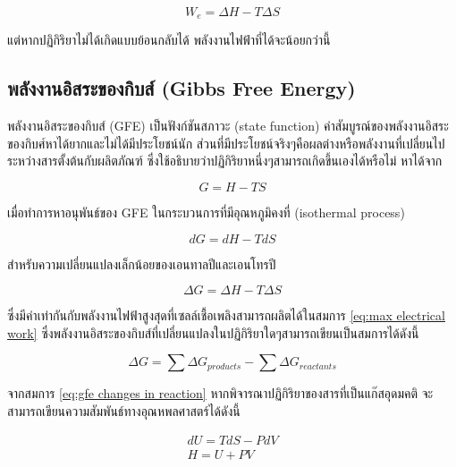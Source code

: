 \message{ !name(solar.tex)}\documentclass[
a4paper,
svgnames,
openany,
justified,
]{tufte-book}
\begin{document}
\begin{equation}
  \label{eq:max electrical work}
  W_e = \Delta H - T \Delta S
\end{equation}

แต่หากปฏิกิริยาไม่ได้เกิดแบบย้อนกลับได้ พลังงานไฟฟ้าที่ได้จะน้อยกว่านี้

\subsection{พลังงานอิสระของกิบส์ (Gibbs Free Energy)}

พลังงานอิสระของกิบส์ (GFE) เป็นฟังก์ชันสภาวะ (state function) ค่าสัมบูรณ์ของพลังงานอิสระของกิบศ์หาได้ยากและไม่ได้มีประโยชน์นัก ส่วนที่มีประโยชน์จริงๆคือผลต่างหรือพลังงานที่เปลี่ยนไประหว่างสารตั้งต้นกับผลิตภัณฑ์ ซึ่งใช้อธิบายว่าปฏิกิริยาหนึ่งๆสามารถเกิดขึ้นเองได้หรือไม่ หาได้จาก

\begin{equation}
  \label{eq:gfe definition}
  G = H - TS
\end{equation}

เมื่อทำการหาอนุพันธ์ของ GFE ในกระบวนการที่มีอุณหภูมิคงที่ (isothermal process)

\begin{equation}
  \label{eq:gfe derivative}
  dG = dH - TdS
\end{equation}

สำหรับความเปลี่ยนแปลงเล็กน้อยของเอนทาลปีและเอนโทรปี

\begin{equation}
  \label{eq:gfe changes}
  \Delta G = \Delta H - T \Delta S
\end{equation}

ซึ่งมีค่าเท่ากันกับพลังงานไฟฟ้าสูงสุดที่เซลล์เชื้อเพลิงสามารถผลิตได้ในสมการ \ref{eq:max electrical work} ซึ่งพลังงานอิสระของกิบส์ที่เปลี่ยนแปลงในปฏิกิริยาใดๆสามารถเขียนเป็นสมการได้ดังนี้

\begin{equation}
  \label{eq:gfe changes in reaction}
  \Delta G = \sum \Delta G_{products} - \sum \Delta G_{reactants}
\end{equation}

จากสมการ \ref{eq:gfe changes in reaction} หากพิจารณาปฏิกิริยาของสารที่เป็นแก๊สอุดมคติ จะสามารถเขียนความสัมพันธ์ทางอุณหพลศาสตร์ได้ดังนี้

\begin{gather}
  dU = TdS - PdV \\
  H = U + PV
\end{gather}
\end{document}
